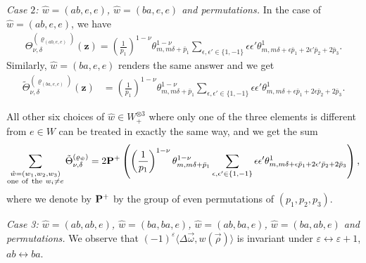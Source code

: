 \documentclass[pdftex]{sigma}
\def\bos{\varrho}
\theoremstyle{definition}
\numberwithin{equation}{section}
\begin{document}
{\em Case $2$: $\hat w=(ab,e,e)$, $\hat w=(ba,e,e)$ and permutations.}
In the case of $\hat w=(ab,e,e)$, we have
\begin{gather*}
 \Theta_{\nu,\delta}^{(\bos_{(ab,e,e)})}(\mathbf{z}) =\left(\frac{1}{p_1}\right)^{1-\nu} \theta^{1-\nu}_{m,m\delta+\bar{p}_1}
 \sum_{\epsilon,\epsilon'\in \{1,-1\}} \epsilon \epsilon' \theta^1_{m,m\delta + \epsilon{\bar p_1}+ 2\epsilon'{\bar p_2}+2{\bar p_3}} .
\end{gather*}
Similarly, $\hat w=(ba,e,e)$ renders the same answer and we get
\begin{align*}
 \tilde\Theta_{\nu,\delta}^{(\bos_{(ba,e,e)})}(\mathbf{z})
&= \left(\frac{1}{p_1}\right)^{1-\nu}
 \theta^{1-\nu}_{m,m\delta+\bar p_1} \sum_{\epsilon,\epsilon'\in \{1,-1\}} \epsilon \epsilon' \theta^1_{m,m\delta + \epsilon\bar p_1+ 2\epsilon \bar p_2+ 2 \bar p_3} .
\end{align*}

All other six choices of $\hat w\in W_+^{\otimes 3}$ where only one of the three elements is different from $e\in W$ can be treated in exactly the same way, and we get the sum
\begin{gather*}\label{intro-PplusEvPerm}
\sum_{\substack{\hat w=(w_1,w_2,w_3)\\{\rm{one~of~the~}}w_i \neq e }} \tilde\Theta_{\nu,\delta}^{(\bos_{\hat w})}
 = 2 {\bf P}^+ \left(\left(\frac{1}{p_1}\right)^{1-\nu}
 \theta^{1-\nu}_{m,m\delta+\bar p_1} \sum_{\epsilon,\epsilon'\in \{1,-1\}} \epsilon\epsilon' \theta^1_{m,m\delta +\epsilon \bar p_1+ 2 \epsilon' \bar p_2+ 2\bar p_3 }\right),
\end{gather*}
where we denote by ${\bf P}^+$ by the group of even permutations of $(p_1,p_2,p_3)$.

{\em Case 3: $\hat w=(ab,ab,e)$, $\hat w=(ba,ba,e)$, $\hat w=(ab,ba,e)$, $\hat w=(ba,ab,e)$ and permutations.}
We observe that $(-1)^{\varepsilon} \langle \Delta\vec\omega, w(\vec{\rho}) \rangle$ is invariant under $\varepsilon\leftrightarrow \varepsilon+1$, $ab\leftrightarrow ba$.
\end{document}
